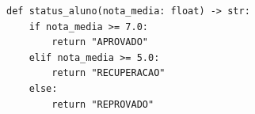 \ifmostrarGabarito
\begin{verbatim}
def status_aluno(nota_media: float) -> str:
    if nota_media >= 7.0:
        return "APROVADO"
    elif nota_media >= 5.0:
        return "RECUPERACAO"
    else:
        return "REPROVADO"
\end{verbatim}

\fi
